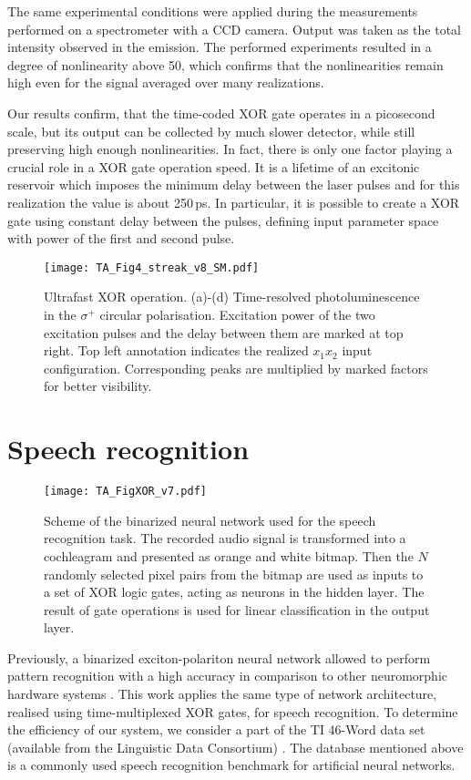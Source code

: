 \documentclass[
 print,
 amsmath,amssymb,
 aps,
]{revtex4-2}
\begin{document}
	The same experimental conditions were applied during the measurements performed on a spectrometer with a CCD camera. Output was taken as the total intensity observed in the emission. The performed experiments resulted in a degree of nonlinearity above 50, which confirms that the nonlinearities remain high even for the signal averaged over many realizations.
	
	Our results confirm, that the time-coded XOR gate operates in a picosecond scale, but its output can be collected by much slower detector, while still preserving high enough nonlinearities. In fact, there is only one factor playing a crucial role in a XOR gate operation speed. It is a lifetime of an excitonic reservoir which imposes the minimum delay between the laser pulses and for this realization the value is about 250\,ps. In particular, it is possible to create a XOR gate using constant delay between the pulses, defining input parameter space with power of the first and second pulse.
	\begin{figure}[bt!]
		\centering
		\texttt{[image: TA\_Fig4\_streak\_v8\_SM.pdf]}
		\caption{Ultrafast XOR operation. (a)-(d) Time-resolved photoluminescence in the $\sigma^+$ circular polarisation. Excitation power of the two excitation pulses and the delay between them are marked at top right. Top left annotation indicates the realized $x_1x_2$ input configuration. Corresponding peaks are multiplied by marked factors for better visibility.}
		\label{im:streak}
	\end{figure}
	\section{\label{sec:speech_recognition}Speech recognition}
 
  \begin{figure*}[b!]
    \centering
    \texttt{[image: TA\_FigXOR\_v7.pdf]}
    \caption{Scheme of the binarized neural network used for the speech recognition task. The recorded audio signal is transformed into a cochleagram and presented as orange and white bitmap. Then the $ N $ randomly selected pixel pairs from the bitmap are used as inputs to a set of XOR logic gates, acting as neurons in the hidden layer. The result of gate operations is used for linear classification in the output layer.}
    \label{fig:fig_1A}
    \end{figure*}
 
    Previously, a binarized exciton-polariton neural network allowed to perform pattern recognition with a high accuracy in comparison to other neuromorphic hardware systems \citep{Mirek_XOR}. This work applies the same type of network architecture, realised using time-multiplexed XOR gates, for speech recognition. To determine the efficiency of our system, we consider a part of the TI 46-Word data set (available from the Linguistic Data Consortium) \citep{TI46}. The database mentioned above is a commonly used speech recognition benchmark for artificial neural networks.
   
\end{document}
